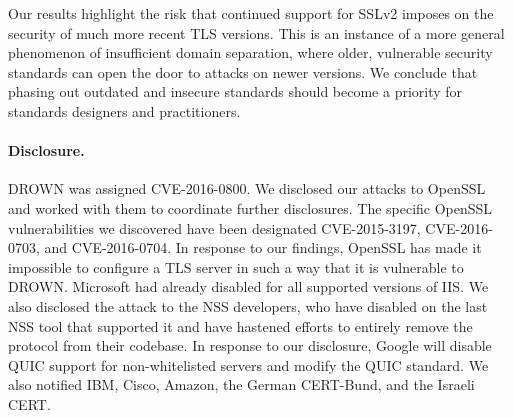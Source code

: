 Our results highlight the risk that continued support for SSLv2 imposes on
the security of much more recent TLS versions. This is an instance of a more
general phenomenon of insufficient domain separation, where older, vulnerable
security standards can open the door to attacks on newer versions. We
conclude that phasing out outdated and insecure standards should become a
priority for standards designers and practitioners.

\paragraph{Disclosure.}
DROWN was assigned CVE-2016-0800. We disclosed our attacks to OpenSSL and
worked with them to coordinate further disclosures. The specific OpenSSL
vulnerabilities we discovered have been designated CVE-2015-3197,
CVE-2016-0703, and CVE-2016-0704. In response to our findings, OpenSSL has
made it impossible to configure a TLS server in such a way that it is
vulnerable to DROWN\@. Microsoft had already disabled \ssltwo for all
supported versions of IIS\@. We also disclosed the attack to the NSS
developers, who have disabled \ssltwo on the last NSS tool that supported it
and have hastened efforts to entirely remove the protocol from their
codebase. In response to our disclosure, Google will disable QUIC support for
non-whitelisted servers and modify the QUIC standard. We also notified IBM,
Cisco, Amazon, the German CERT-Bund, and the Israeli CERT\@.
